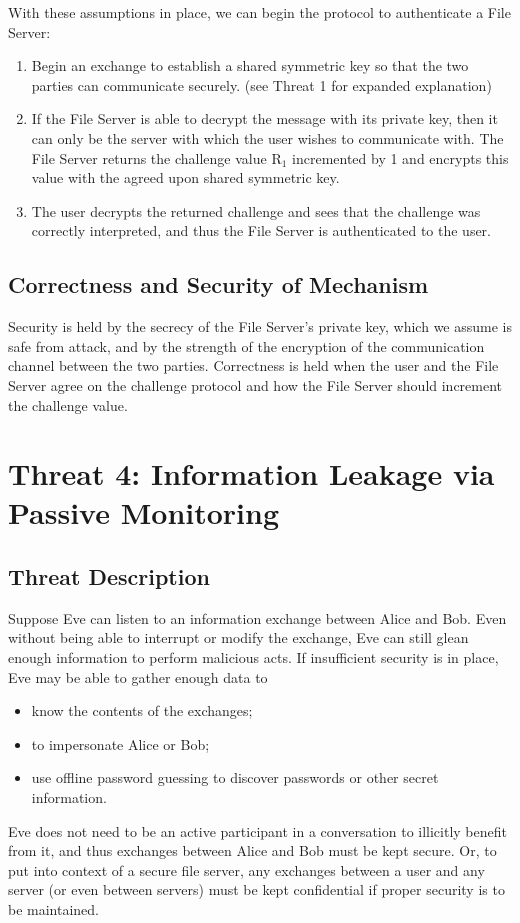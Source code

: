 \documentclass[11pt]{article}
\begin{document}
With these assumptions in place, we can begin the protocol to authenticate a File Server:
\begin{enumerate}
\item{}Begin an exchange to establish a shared symmetric key so that the two parties can communicate securely. (see Threat 1 for expanded explanation)
\item{}If the File Server is able to decrypt the message with its private key, then it can only be the server with which the user wishes to communicate with. The File Server returns the challenge value R$_1$ incremented by 1 and encrypts this value with the agreed upon shared symmetric key.
\item{}The user decrypts the returned challenge and sees that the challenge was correctly interpreted, and thus the File Server is authenticated to the user.
\end{enumerate}
\subsection{Correctness and Security of Mechanism}
Security is held by the secrecy of the File Server's private key, which we assume is safe from attack, and by the strength of the encryption of the communication channel between the two parties. Correctness is held when the user and the File Server agree on the challenge protocol and how the File Server should increment the challenge value.
\section{Threat 4: Information Leakage via Passive Monitoring}
\subsection{Threat Description}
Suppose Eve can listen to an information exchange between Alice and Bob. Even without being able to interrupt or modify the exchange, Eve can still glean enough information to perform malicious acts. If insufficient security is in place, Eve may be able to gather enough data to
\begin{itemize}
\item know the contents of the exchanges;
\item to impersonate Alice or Bob;
\item use offline password guessing to discover passwords or other secret information.
\end{itemize}
Eve does not need to be an active participant in a conversation to illicitly benefit from it, and thus exchanges between Alice and Bob must be kept secure. Or, to put into context of a secure file server, any exchanges between a user and any server (or even between servers) must be kept confidential if proper security is to be maintained.
\end{document}
